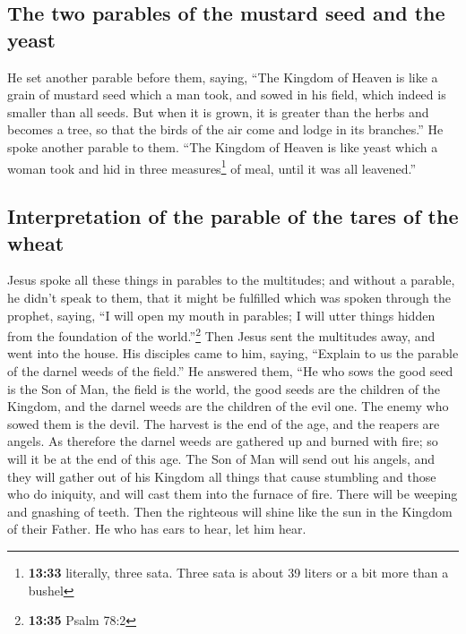 \hypertarget{the-two-parables-of-the-mustard-seed-and-the-yeast}{%
\subsection{The two parables of the mustard seed and the
yeast}\label{the-two-parables-of-the-mustard-seed-and-the-yeast}}

 He set another parable before them, saying, ``The
Kingdom of Heaven is like a grain of mustard seed which a man took, and
sowed in his field,  which indeed is smaller than all
seeds. But when it is grown, it is greater than the herbs and becomes a
tree, so that the birds of the air come and lodge in its branches.''
 He spoke another parable to them. ``The Kingdom of
Heaven is like yeast which a woman took and hid in three
measures\footnote{\textbf{13:33} literally, three sata. Three sata is
  about 39 liters or a bit more than a bushel} of meal, until it was all
leavened.''

\hypertarget{interpretation-of-the-parable-of-the-tares-of-the-wheat}{%
\subsection{Interpretation of the parable of the tares of the
wheat}\label{interpretation-of-the-parable-of-the-tares-of-the-wheat}}

 Jesus spoke all these things in parables to the
multitudes; and without a parable, he didn't speak to them,
 that it might be fulfilled which was spoken through the
prophet, saying, ``I will open my mouth in parables; I will utter things
hidden from the foundation of the world.''\footnote{\textbf{13:35} Psalm
  78:2}  Then Jesus sent the multitudes away, and went
into the house. His disciples came to him, saying, ``Explain to us the
parable of the darnel weeds of the field.''  He answered
them, ``He who sows the good seed is the Son of Man,  the
field is the world, the good seeds are the children of the Kingdom, and
the darnel weeds are the children of the evil one.  The
enemy who sowed them is the devil. The harvest is the end of the age,
and the reapers are angels.  As therefore the darnel
weeds are gathered up and burned with fire; so will it be at the end of
this age.  The Son of Man will send out his angels, and
they will gather out of his Kingdom all things that cause stumbling and
those who do iniquity,  and will cast them into the
furnace of fire. There will be weeping and gnashing of teeth.
 Then the righteous will shine like the sun in the
Kingdom of their Father. He who has ears to hear, let him hear.

